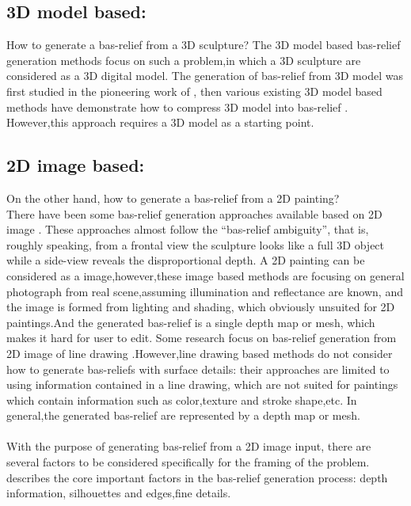\subsection{3D model based:} How to generate a bas-relief from a 3D sculpture? The 3D model based bas-relief generation methods focus on such a problem,in which a 3D sculpture are considered as a 3D digital model.   The generation of bas-relief from 3D model was first studied in the pioneering work of \cite{cignoni1997computer}, then various existing 3D model based methods have demonstrate how to compress 3D model into bas-relief \cite{weyrich2007digital}\cite{kerber2009feature}\cite{song2007automatic}\cite{sun2009bas} . However,this approach requires a 3D model as a starting point.
\subsection{2D image based:}\label{2dimagebased} On the other hand, how to generate a bas-relief from a 2D painting? \\ There have been some bas-relief generation approaches available based on 2D image \cite{zeng2014region}\cite{wu2013making}  \cite{alexa2010reliefs}\cite{wu2008interactive}.  These approaches almost follow the “bas-relief ambiguity”\cite{belhumeur1999bas}, that is, roughly speaking, from a frontal view the sculpture looks like a full 3D object while a side-view reveals the disproportional depth. 
A 2D painting can be considered as a image,however,these image based methods are focusing on general photograph from real scene,assuming illumination and reflectance are known, and the image is formed from lighting and shading, which obviously unsuited for 2D paintings.And the generated bas-relief is a single depth map or mesh, which makes it hard for user to edit. 
Some research focus on bas-relief generation from 2D image of line drawing \cite{kolomenkin2011reconstruction}\cite{varley2002estimating}\cite{malik1987interpreting}\cite{sykora2014ink}.However,line drawing based methods do not consider how to generate bas-reliefs with surface details: their approaches are limited to using information contained in a line drawing, which are not suited for paintings which contain information such as color,texture and stroke shape,etc. In general,the generated bas-relief are represented by a depth map or mesh.  \\ \\  
With the purpose of generating bas-relief from a 2D image input, there are several factors to be considered specifically for the framing of the problem.\cite{benzaid2017analysis} describes the core important factors in the bas-relief generation process: depth information, silhouettes and edges,fine details.\\
